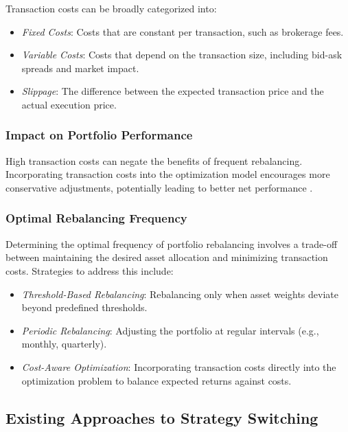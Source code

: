 Transaction costs can be broadly categorized into:

\begin{itemize}
    \item \textit{Fixed Costs}: Costs that are constant per transaction, such as brokerage fees.
    \item \textit{Variable Costs}: Costs that depend on the transaction size, including bid-ask spreads and market impact.
    \item \textit{Slippage}: The difference between the expected transaction price and the actual execution price.
\end{itemize}

\subsubsection{Impact on Portfolio Performance}

High transaction costs can negate the benefits of frequent rebalancing. Incorporating transaction costs into the optimization model encourages more conservative adjustments, potentially leading to better net performance \cite{garleanu2009dynamic}.

\subsubsection{Optimal Rebalancing Frequency}

Determining the optimal frequency of portfolio rebalancing involves a trade-off between maintaining the desired asset allocation and minimizing transaction costs. Strategies to address this include:

\begin{itemize}
    \item \textit{Threshold-Based Rebalancing}: Rebalancing only when asset weights deviate beyond predefined thresholds.
    \item \textit{Periodic Rebalancing}: Adjusting the portfolio at regular intervals (e.g., monthly, quarterly).
    \item \textit{Cost-Aware Optimization}: Incorporating transaction costs directly into the optimization problem to balance expected returns against costs.
\end{itemize}

\subsection{Existing Approaches to Strategy Switching}

